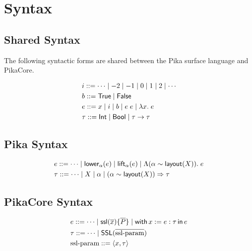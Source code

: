 \section{Syntax}

\subsection{Shared Syntax}

The following syntactic forms are shared between the Pika surface language and PikaCore.

\begin{align*}
  &i ::= \cdots \mid -2 \mid -1 \mid 0 \mid 1 \mid 2 \mid \cdots
  \\
  &b ::= \textsf{True}{} \mid \textsf{False}
  \\
  &e ::= x \mid i \mid b \mid e\; e \mid \lambda x.\; e
  \\
  &\tau ::= \textsf{Int} \mid \textsf{Bool} \mid \tau \rightarrow \tau
\end{align*}

\subsection{Pika Syntax}
\begin{align*}
  &e ::= \cdots \mid \textsf{lower}_{\alpha}(e) \mid \textsf{lift}_{\alpha}(e) \mid \Lambda (\alpha \sim \textsf{layout}(X)).\; e
  \\
  &\tau ::= \cdots \mid X \mid \alpha \mid (\alpha \sim \textsf{layout}(X)) \Rightarrow \tau
\end{align*}

\subsection{PikaCore Syntax}
\begin{align*}
  &e ::= \cdots \mid \textsf{ssl}(\overline{x}) \{ \overline{P} \} \mid \textsf{with}\,x := e : \tau\,\textsf{in}\, e
  \\
  &\tau ::= \cdots \mid \textsf{SSL}(\overline{\textnormal{ssl-param}})
  \\
  &\textnormal{ssl-param} ::= \langle x, \tau \rangle
\end{align*}

